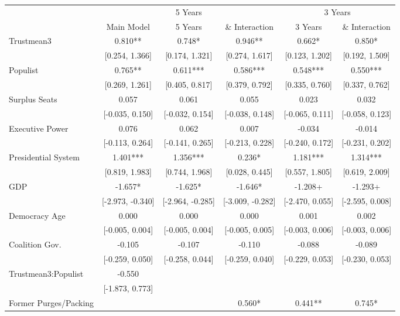 \begin{table}
\centering\centering
\fontsize{9}{11}\selectfont
\begin{tabular}[t]{lccccc}
\toprule
\multicolumn{1}{c}{ } & \multicolumn{3}{c}{5 Years} & \multicolumn{2}{c}{3 Years} \\
\cmidrule(l{3pt}r{3pt}){2-4} \cmidrule(l{3pt}r{3pt}){5-6}
  & Main Model & 5 Years & \& Interaction & 3 Years & \& Interaction \\
\midrule
Trustmean3 & 0.810** & 0.748* & 0.946** & 0.662* & 0.850*\\
 & {}[0.254, 1.366] & {}[0.174, 1.321] & {}[0.274, 1.617] & {}[0.123, 1.202] & {}[0.192, 1.509]\\
Populist & 0.765** & 0.611*** & 0.586*** & 0.548*** & 0.550***\\
 & {}[0.269, 1.261] & {}[0.405, 0.817] & {}[0.379, 0.792] & {}[0.335, 0.760] & {}[0.337, 0.762]\\
Surplus Seats & 0.057 & 0.061 & 0.055 & 0.023 & 0.032\\
 & {}[-0.035, 0.150] & {}[-0.032, 0.154] & {}[-0.038, 0.148] & {}[-0.065, 0.111] & {}[-0.058, 0.123]\\
Executive Power & 0.076 & 0.062 & 0.007 & -0.034 & -0.014\\
 & {}[-0.113, 0.264] & {}[-0.141, 0.265] & {}[-0.213, 0.228] & {}[-0.240, 0.172] & {}[-0.231, 0.202]\\
Presidential System & 1.401*** & 1.356*** & 0.236* & 1.181*** & 1.314***\\
 & {}[0.819, 1.983] & {}[0.744, 1.968] & {}[0.028, 0.445] & {}[0.557, 1.805] & {}[0.619, 2.009]\\
GDP & -1.657* & -1.625* & -1.646* & -1.208+ & -1.293+\\
 & {}[-2.973, -0.340] & {}[-2.964, -0.285] & {}[-3.009, -0.282] & {}[-2.470, 0.055] & {}[-2.595, 0.008]\\
Democracy Age & 0.000 & 0.000 & 0.000 & 0.001 & 0.002\\
 & {}[-0.005, 0.004] & {}[-0.005, 0.004] & {}[-0.005, 0.005] & {}[-0.003, 0.006] & {}[-0.003, 0.006]\\
Coalition Gov. & -0.105 & -0.107 & -0.110 & -0.088 & -0.089\\
 & {}[-0.259, 0.050] & {}[-0.258, 0.044] & {}[-0.259, 0.040] & {}[-0.229, 0.053] & {}[-0.230, 0.053]\\
Trustmean3:Populist & -0.550 &  &  &  & \\
 & {}[-1.873, 0.773] &  &  &  & \\
Former Purges/Packing &  &  & 0.560* & 0.441** & 0.745*\\

\end{tabular}
\end{table}
